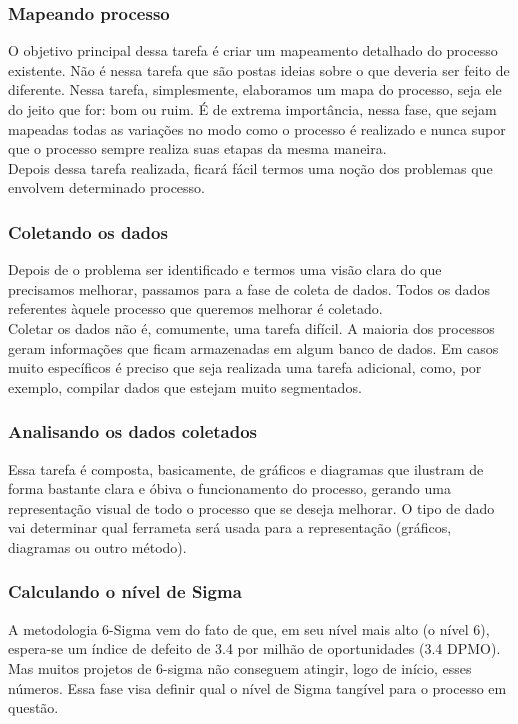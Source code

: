 \documentclass{abnt}
\begin{document}
					\subsubsection {Mapeando processo}
					O objetivo principal dessa tarefa é criar um mapeamento detalhado do processo existente.
					Não é nessa tarefa que são postas ideias sobre o que deveria ser feito de diferente. 
					Nessa tarefa, simplesmente, elaboramos um mapa do processo, seja ele do jeito que for: bom ou ruim.
					É de extrema importância, nessa fase, que sejam mapeadas todas as variações no modo como o processo é realizado e 
					nunca supor que o processo sempre realiza suas etapas da mesma maneira.
					\\
					Depois dessa tarefa realizada, ficará fácil termos uma noção dos problemas que envolvem determinado processo.
					\subsubsection {Coletando os dados}
					Depois de o problema ser identificado e termos uma visão clara do que precisamos melhorar, passamos para a 
					fase de coleta de dados. Todos os dados referentes àquele processo que queremos melhorar é coletado.
					\\
					Coletar os dados não é, comumente, uma tarefa difícil. A maioria dos processos geram informações que 
					ficam armazenadas em algum banco de dados. Em casos muito específicos é preciso que seja realizada uma 
					tarefa adicional, como, por exemplo, compilar dados que estejam muito segmentados.
					
					\subsubsection {Analisando os dados coletados}
					Essa tarefa é composta, basicamente, de gráficos e diagramas que ilustram de forma bastante clara e óbiva 
					o funcionamento do processo, gerando uma representação visual de todo o processo que se deseja melhorar. O tipo de dado vai determinar qual 
					ferrameta será usada para a representação (gráficos, diagramas ou outro método).
					\subsubsection {Calculando o nível de Sigma}
					A metodologia 6-Sigma vem do fato de que, em seu nível mais alto (o nível 6), espera-se um índice de 
					defeito de 3.4 por milhão de oportunidades (3.4 DPMO). Mas muitos projetos de 6-sigma não conseguem 
					atingir, logo de início, esses números. Essa fase visa definir qual o nível de Sigma tangível para o 
					processo em questão.
\end{document}
